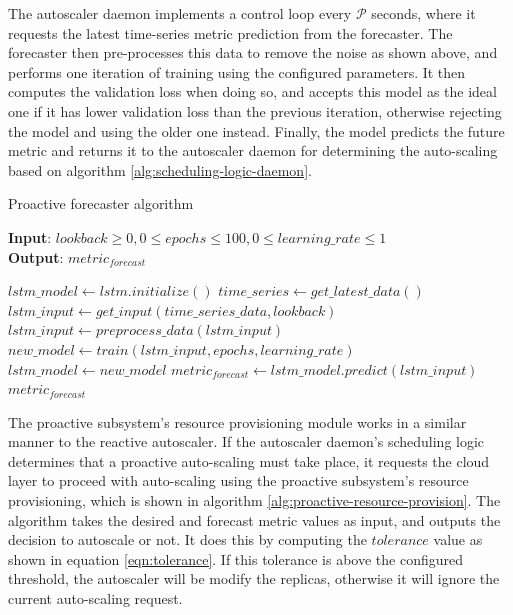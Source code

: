 The autoscaler daemon implements a control loop every $\mathcal{P}$ seconds, where it requests the latest time-series metric prediction from the forecaster. The forecaster then pre-processes this data to remove the noise as shown above, and performs one iteration of training using the configured parameters. It then computes the validation loss when doing so, and accepts this model as the ideal one if it has lower validation loss than the previous iteration, otherwise rejecting the model and using the older one instead. Finally, the model predicts the future metric and returns it to the autoscaler daemon for determining the auto-scaling based on algorithm \ref{alg:scheduling-logic-daemon}.\par

\begin{algorithm}
    \caption{Proactive forecaster algorithm}
    \label{alg:proactive-forecast-alg}
    \textbf{Input}: $lookback \geq 0, 0 \leq epochs \leq 100, 0 \leq learning\_rate \leq 1$\\
    \textbf{Output}: $metric_{forecast}$
    \begin{algorithmic}
        \State $lstm\_model \gets lstm.initialize()$
        \State $time\_series \gets get\_latest\_data()$
        \State $lstm\_input \gets get\_input(time\_series\_data, lookback)$
        \State $lstm\_input \gets preprocess\_data(lstm\_input)$
        \State $new\_model \gets train(lstm\_input, epochs, learning\_rate)$
            \State $lstm\_model \gets new\_model$
        \EndIf
        \State $metric_{forecast} \gets lstm\_model.predict(lstm\_input)$
        \State \Return $metric_{forecast}$
    \end{algorithmic}
\end{algorithm}

The proactive subsystem's resource provisioning module works in a similar manner to the reactive autoscaler. If the autoscaler daemon's scheduling logic determines that a proactive auto-scaling must take place, it requests the cloud layer to proceed with auto-scaling using the proactive subsystem's resource provisioning, which is shown in algorithm \ref{alg:proactive-resource-provision}. The algorithm takes the desired and forecast metric values as input, and outputs the decision to autoscale or not. It does this by computing the $tolerance$ value as shown in equation \ref{eqn:tolerance}. If this tolerance is above the configured threshold, the autoscaler will be modify the replicas, otherwise it will ignore the current auto-scaling request.\par

